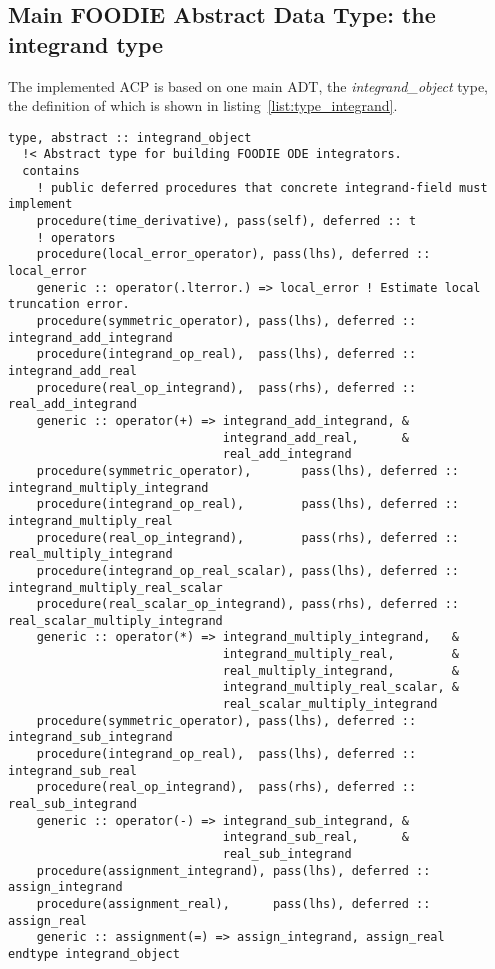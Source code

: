 \subsection{Main FOODIE Abstract Data Type: the integrand type}\label{subsec:type_integrand}

The implemented ACP is based on one main ADT, the \emph{integrand\_object} type, the definition of which is shown in listing~\ref{list:type_integrand}.

\begin{lstlisting}[firstnumber=1,style=code,caption={integrand type definition},label={list:type_integrand}]
type, abstract :: integrand_object
  !< Abstract type for building FOODIE ODE integrators.
  contains
    ! public deferred procedures that concrete integrand-field must implement
    procedure(time_derivative), pass(self), deferred :: t
    ! operators
    procedure(local_error_operator), pass(lhs), deferred :: local_error
    generic :: operator(.lterror.) => local_error ! Estimate local truncation error.
    procedure(symmetric_operator), pass(lhs), deferred :: integrand_add_integrand
    procedure(integrand_op_real),  pass(lhs), deferred :: integrand_add_real
    procedure(real_op_integrand),  pass(rhs), deferred :: real_add_integrand
    generic :: operator(+) => integrand_add_integrand, &
                              integrand_add_real,      &
                              real_add_integrand
    procedure(symmetric_operator),       pass(lhs), deferred :: integrand_multiply_integrand
    procedure(integrand_op_real),        pass(lhs), deferred :: integrand_multiply_real
    procedure(real_op_integrand),        pass(rhs), deferred :: real_multiply_integrand
    procedure(integrand_op_real_scalar), pass(lhs), deferred :: integrand_multiply_real_scalar
    procedure(real_scalar_op_integrand), pass(rhs), deferred :: real_scalar_multiply_integrand
    generic :: operator(*) => integrand_multiply_integrand,   &
                              integrand_multiply_real,        &
                              real_multiply_integrand,        &
                              integrand_multiply_real_scalar, &
                              real_scalar_multiply_integrand
    procedure(symmetric_operator), pass(lhs), deferred :: integrand_sub_integrand
    procedure(integrand_op_real),  pass(lhs), deferred :: integrand_sub_real
    procedure(real_op_integrand),  pass(rhs), deferred :: real_sub_integrand
    generic :: operator(-) => integrand_sub_integrand, &
                              integrand_sub_real,      &
                              real_sub_integrand
    procedure(assignment_integrand), pass(lhs), deferred :: assign_integrand
    procedure(assignment_real),      pass(lhs), deferred :: assign_real
    generic :: assignment(=) => assign_integrand, assign_real
endtype integrand_object
\end{lstlisting}

